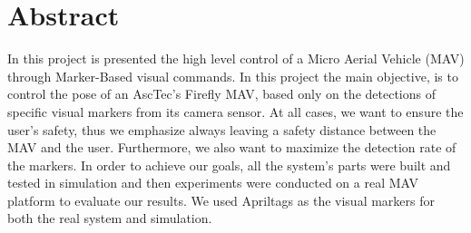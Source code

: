 \chapter*{Abstract}


In this project is presented the high level control of a Micro Aerial Vehicle (MAV) through Marker-Based visual commands. In this project the main objective, is to control the pose of an AscTec’s Firefly MAV, based only on the detections of specific visual markers from its camera sensor. At all cases, we want to ensure the user's safety, thus we emphasize always leaving a safety distance between the MAV and the user. Furthermore, we also want to maximize the detection rate of the markers. In order to achieve our goals, all the system's parts were built and tested in simulation and then experiments were conducted on a real MAV platform to evaluate our results. We used Apriltags\cite{olson2011tags} as the visual markers for both the real system and simulation. 